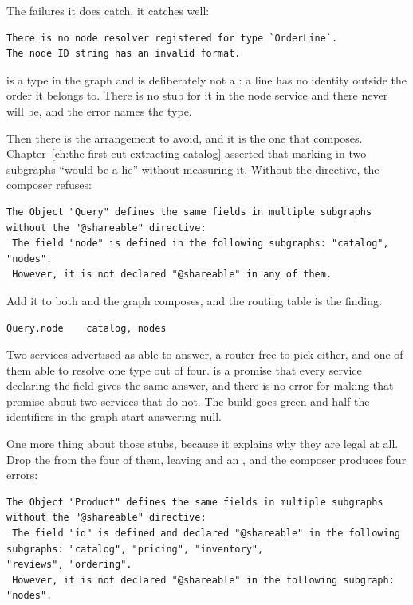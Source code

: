 The failures it does catch, it catches well:

\begin{verbatim}
There is no node resolver registered for type `OrderLine`.
The node ID string has an invalid format.
\end{verbatim}

 is a type in the graph and is deliberately not a : a
line has no identity outside the order it belongs to. There is no stub for it in
the node service and there never will be, and the error names the type.

%
Then there is the arrangement to avoid, and it is the one that composes.
Chapter~\ref{ch:the-first-cut-extracting-catalog} asserted that marking
  in two subgraphs \enquote{would be a lie}
without measuring it. Without the directive, the composer refuses:

\begin{verbatim}
The Object "Query" defines the same fields in multiple subgraphs without the "@shareable" directive:
 The field "node" is defined in the following subgraphs: "catalog", "nodes".
 However, it is not declared "@shareable" in any of them.
\end{verbatim}

Add it to both and the graph composes, and the routing table is the finding:

\begin{verbatim}
Query.node    catalog, nodes
\end{verbatim}

Two services advertised as able to answer, a router free to pick either, and one
of them able to resolve one type out of four.  is a promise
that every service declaring the field gives the same answer, and there is no
error for making that promise about two services that do not. The build goes green and half the identifiers in the graph
start answering null.

%
One more thing about those stubs, because it explains why they are legal at all.
Drop the  from the four of them, leaving  and an
, and the composer produces four errors:

\begin{verbatim}
The Object "Product" defines the same fields in multiple subgraphs without the "@shareable" directive:
 The field "id" is defined and declared "@shareable" in the following subgraphs: "catalog", "pricing", "inventory",
"reviews", "ordering".
 However, it is not declared "@shareable" in the following subgraph: "nodes".
\end{verbatim}

